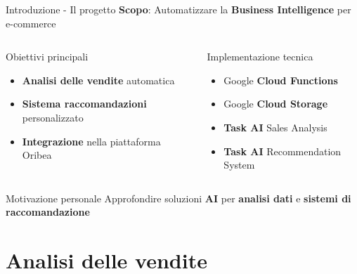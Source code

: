 \documentclass{beamer}
\begin{document}
	\begin{frame}{Introduzione - Il progetto}
		\textbf{Scopo}: Automatizzare la \textbf{Business Intelligence} per e-commerce

		\begin{columns}
			\begin{column}{0.5\textwidth}
				\begin{block}{Obiettivi principali}
					\begin{itemize}
						\item \textbf{Analisi delle vendite} automatica
						\item \textbf{Sistema raccomandazioni} personalizzato
						\item \textbf{Integrazione} nella piattaforma Oribea
					\end{itemize}
				\end{block}
			\end{column}
			\begin{column}{0.5\textwidth}
				\begin{block}{Implementazione tecnica}
					\begin{itemize}
						\item Google \textbf{Cloud Functions}
						\item Google \textbf{Cloud Storage}
						\item \textbf{Task AI} Sales Analysis
						\item \textbf{Task AI} Recommendation System
					\end{itemize}
				\end{block}
			\end{column}
		\end{columns}

		\begin{alertblock}{Motivazione personale}
			Approfondire soluzioni \textbf{AI} per \textbf{analisi dati} e \textbf{sistemi di raccomandazione}
		\end{alertblock}
	\end{frame}


	\section{Analisi delle vendite}
\end{document}
